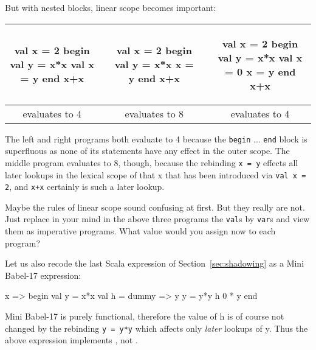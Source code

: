 \documentclass{llncs}
\newcommand{\bsrc}[1] {\lstinline!#1!}
\begin{document}
But with nested blocks, linear scope becomes important:
\begin{center}
\begin{tabular}{c|cc|cc}
\begin{babellisting}
val x = 2
begin
  val y = x*x
  val x = y
end
x+x  
\end{babellisting}
&
&
\begin{babellisting}
val x = 2
begin
  val y = x*x
  x = y
end
x+x 
\end{babellisting}
&
&
\begin{babellisting}
val x = 2
begin
  val y = x*x
  val x = 0
  x = y
end
x+x 
\end{babellisting}
\\\hline
evaluates to 4 & & evaluates to 8 & & evaluates to 4
\end{tabular}
\end{center}
The left and right programs both evaluate to 4 because the \bsrc{begin} ... \bsrc{end} block is superfluous as none of its statements have any effect in the outer scope.  The middle program evaluates to 8, though, because the rebinding \bsrc{x = y} effects all later lookups in the lexical scope of  that x that has been introduced via \bsrc{val x = 2}, and \bsrc{x+x} certainly is such a later lookup. 

Maybe the rules of linear scope sound confusing at first. But they really are not. Just replace in your mind in the above three programs the \bsrc{val}s by \bsrc{var}s and view them as imperative programs. What value would you assign now to each program?

Let us also recode the last Scala expression of Section~\ref{sec:shadowing} as a Mini Babel-17 expression:
\begin{babellisting}
x => begin
        val y = x*x
        val h = dummy => y
        y = y*y
        h 0 * y
      end
\end{babellisting} 
Mini Babel-17 is purely functional, therefore the value of h is of course not changed by the rebinding \bsrc{y = y*y} which affects only \emph{later} lookups of y. Thus the above expression implements , not .
\end{document}

